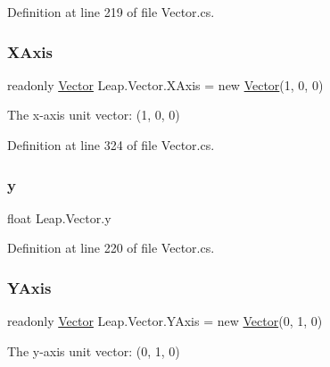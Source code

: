 Definition at line 219 of file Vector.\+cs.

\mbox{\label{struct_leap_1_1_vector_ad62a202318bf591b431928859449b19c}} 
\subsubsection{\texorpdfstring{XAxis}{XAxis}}
{\footnotesize\ttfamily readonly \mbox{\hyperlink{struct_leap_1_1_vector}{Vector}} Leap.\+Vector.\+X\+Axis = new \mbox{\hyperlink{struct_leap_1_1_vector}{Vector}}(1, 0, 0)\hspace{0.3cm}{\ttfamily [static]}}



The x-\/axis unit vector\+: (1, 0, 0) 



Definition at line 324 of file Vector.\+cs.

\mbox{\label{struct_leap_1_1_vector_a458897a143435a1292796d8dfb1d760d}} 
\subsubsection{\texorpdfstring{y}{y}}
{\footnotesize\ttfamily float Leap.\+Vector.\+y}



Definition at line 220 of file Vector.\+cs.

\mbox{\label{struct_leap_1_1_vector_abf07de0f419b3de5776e046d35c0843e}} 
\subsubsection{\texorpdfstring{YAxis}{YAxis}}
{\footnotesize\ttfamily readonly \mbox{\hyperlink{struct_leap_1_1_vector}{Vector}} Leap.\+Vector.\+Y\+Axis = new \mbox{\hyperlink{struct_leap_1_1_vector}{Vector}}(0, 1, 0)\hspace{0.3cm}{\ttfamily [static]}}



The y-\/axis unit vector\+: (0, 1, 0) 



